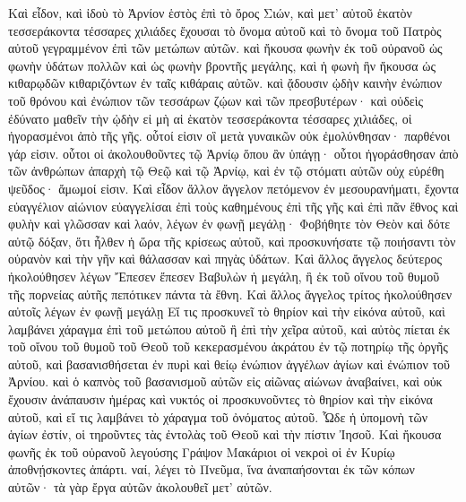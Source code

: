 \begin{pages}
    \begin{Rightside}
        \beginnumbering
		Καὶ εἶδον, καὶ ἰδοὺ τὸ Ἀρνίον ἑστὸς ἐπὶ τὸ ὄρος Σιών, καὶ μετ’ αὐτοῦ ἑκατὸν τεσσεράκοντα τέσσαρες χιλιάδες ἔχουσαι τὸ ὄνομα αὐτοῦ καὶ τὸ ὄνομα τοῦ Πατρὸς αὐτοῦ γεγραμμένον ἐπὶ τῶν μετώπων αὐτῶν. καὶ ἤκουσα φωνὴν ἐκ τοῦ οὐρανοῦ ὡς φωνὴν ὑδάτων πολλῶν καὶ ὡς φωνὴν βροντῆς μεγάλης, καὶ ἡ φωνὴ ἣν ἤκουσα ὡς κιθαρῳδῶν κιθαριζόντων ἐν ταῖς κιθάραις αὐτῶν. 
		\pend
		\pstart
		καὶ ᾄδουσιν ᾠδὴν καινὴν ἐνώπιον τοῦ θρόνου καὶ ἐνώπιον τῶν τεσσάρων ζῴων καὶ τῶν πρεσβυτέρων· καὶ οὐδεὶς ἐδύνατο μαθεῖν τὴν ᾠδὴν εἰ μὴ αἱ ἑκατὸν τεσσεράκοντα τέσσαρες χιλιάδες, οἱ ἠγορασμένοι ἀπὸ τῆς γῆς. οὗτοί εἰσιν οἳ μετὰ γυναικῶν οὐκ ἐμολύνθησαν· παρθένοι γάρ εἰσιν. οὗτοι οἱ ἀκολουθοῦντες τῷ Ἀρνίῳ ὅπου ἂν ὑπάγῃ· οὗτοι ἠγοράσθησαν ἀπὸ τῶν ἀνθρώπων ἀπαρχὴ τῷ Θεῷ καὶ τῷ Ἀρνίῳ, καὶ ἐν τῷ στόματι αὐτῶν οὐχ εὑρέθη ψεῦδος· ἄμωμοί εἰσιν.
		\pend
		\pstart
		Καὶ εἶδον ἄλλον ἄγγελον πετόμενον ἐν μεσουρανήματι, ἔχοντα εὐαγγέλιον αἰώνιον εὐαγγελίσαι ἐπὶ τοὺς καθημένους ἐπὶ τῆς γῆς καὶ ἐπὶ πᾶν ἔθνος καὶ φυλὴν καὶ γλῶσσαν καὶ λαόν, λέγων ἐν φωνῇ μεγάλῃ· Φοβήθητε τὸν Θεὸν καὶ δότε αὐτῷ δόξαν, ὅτι ἦλθεν ἡ ὥρα τῆς κρίσεως αὐτοῦ, καὶ προσκυνήσατε τῷ ποιήσαντι τὸν οὐρανὸν καὶ τὴν γῆν καὶ θάλασσαν καὶ πηγὰς ὑδάτων. 
		\pend
		\pstart
		Καὶ ἄλλος ἄγγελος δεύτερος ἠκολούθησεν λέγων Ἔπεσεν ἔπεσεν Βαβυλὼν ἡ μεγάλη, ἣ ἐκ τοῦ οἴνου τοῦ θυμοῦ τῆς πορνείας αὐτῆς πεπότικεν πάντα τὰ ἔθνη. 
		\pend
		\pstart
		Καὶ ἄλλος ἄγγελος τρίτος ἠκολούθησεν αὐτοῖς λέγων ἐν φωνῇ μεγάλῃ Εἴ τις προσκυνεῖ τὸ θηρίον καὶ τὴν εἰκόνα αὐτοῦ, καὶ λαμβάνει χάραγμα ἐπὶ τοῦ μετώπου αὐτοῦ ἢ ἐπὶ τὴν χεῖρα αὐτοῦ, καὶ αὐτὸς πίεται ἐκ τοῦ οἴνου τοῦ θυμοῦ τοῦ Θεοῦ τοῦ κεκερασμένου ἀκράτου ἐν τῷ ποτηρίῳ τῆς ὀργῆς αὐτοῦ, καὶ βασανισθήσεται ἐν πυρὶ καὶ θείῳ ἐνώπιον ἀγγέλων ἁγίων καὶ ἐνώπιον τοῦ Ἀρνίου. 
		\pend
		\pstart
		καὶ ὁ καπνὸς τοῦ βασανισμοῦ αὐτῶν εἰς αἰῶνας αἰώνων ἀναβαίνει, καὶ οὐκ ἔχουσιν ἀνάπαυσιν ἡμέρας καὶ νυκτός οἱ προσκυνοῦντες τὸ θηρίον καὶ τὴν εἰκόνα αὐτοῦ, καὶ εἴ τις λαμβάνει τὸ χάραγμα τοῦ ὀνόματος αὐτοῦ. Ὧδε ἡ ὑπομονὴ τῶν ἁγίων ἐστίν, οἱ τηροῦντες τὰς ἐντολὰς τοῦ Θεοῦ καὶ τὴν πίστιν Ἰησοῦ. 
		\pend
		\pstart
		Καὶ ἤκουσα φωνῆς ἐκ τοῦ οὐρανοῦ λεγούσης Γράψον Μακάριοι οἱ νεκροὶ οἱ ἐν Κυρίῳ ἀποθνῄσκοντες ἀπάρτι. ναί, λέγει τὸ Πνεῦμα, ἵνα ἀναπαήσονται ἐκ τῶν κόπων αὐτῶν· τὰ γὰρ ἔργα αὐτῶν ἀκολουθεῖ μετ’ αὐτῶν.

\end{Rightside}
\end{pages}
